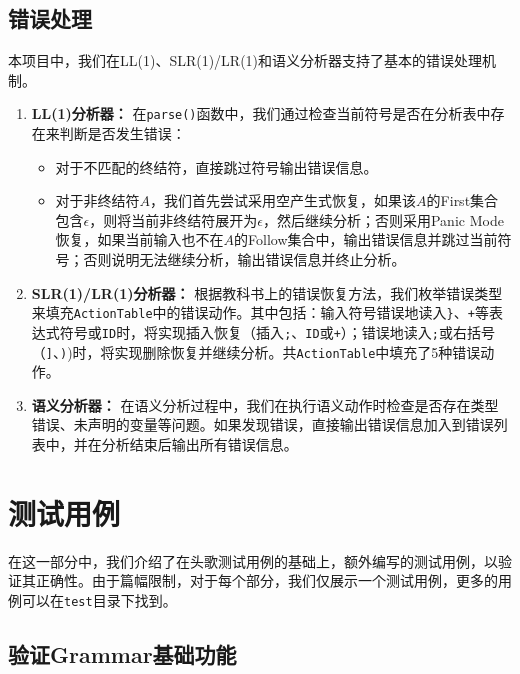 \documentclass[UTF8,openany]{ctexbook}
\begin{document}
\section{错误处理}

本项目中，我们在LL(1)、SLR(1)/LR(1)和语义分析器支持了基本的错误处理机制。

\begin{enumerate}[noitemsep,topsep=0pt,partopsep=0pt]
    \item \textbf{LL(1)分析器：} 在\texttt{parse()}函数中，我们通过检查当前符号是否在分析表中存在来判断是否发生错误：
    \begin{itemize}[noitemsep,topsep=0pt,partopsep=0pt]
        \item 对于不匹配的终结符，直接跳过符号输出错误信息。
        \item 对于非终结符$A$，我们首先尝试采用空产生式恢复，如果该$A$的First集合包含$\epsilon$，则将当前非终结符展开为$\epsilon$，然后继续分析；否则采用Panic Mode恢复，如果当前输入也不在$A$的Follow集合中，输出错误信息并跳过当前符号；否则说明无法继续分析，输出错误信息并终止分析。
    \end{itemize}
    \item \textbf{SLR(1)/LR(1)分析器：} 根据教科书上的错误恢复方法，我们枚举错误类型来填充\texttt{ActionTable}中的错误动作。其中包括：输入符号错误地读入\texttt{\}}、\texttt{+}等表达式符号或\texttt{ID}时，将实现插入恢复（插入\texttt{;}、\texttt{ID}或\texttt{+}）；错误地读入\texttt{;}或右括号（\texttt{]}、\texttt{)})时，将实现删除恢复并继续分析。共\texttt{ActionTable}中填充了5种错误动作。
    \item \textbf{语义分析器：} 在语义分析过程中，我们在执行语义动作时检查是否存在类型错误、未声明的变量等问题。如果发现错误，直接输出错误信息加入到错误列表中，并在分析结束后输出所有错误信息。
    
\end{enumerate}

\chapter{测试用例}
\label{sec:test}

在这一部分中，我们介绍了在头歌测试用例的基础上，额外编写的测试用例，以验证其正确性。由于篇幅限制，对于每个部分，我们仅展示一个测试用例，更多的用例可以在\texttt{test}目录下找到。

\section{验证Grammar基础功能}
\label{sec:test_grammar}
\end{document}
